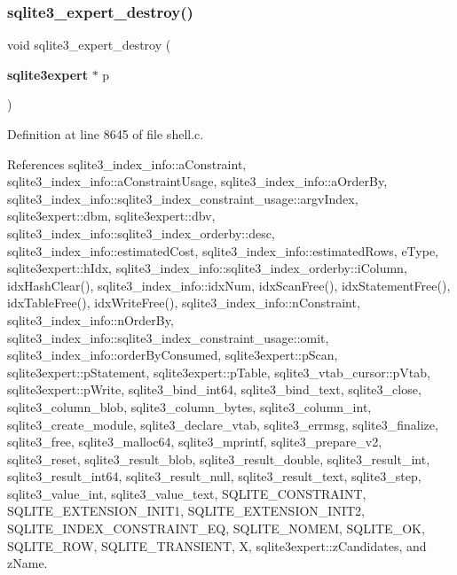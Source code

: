 \subsubsection{sqlite3\+\_\+expert\+\_\+destroy()}
{\footnotesize\ttfamily void sqlite3\+\_\+expert\+\_\+destroy (\begin{DoxyParamCaption}\item[{\textbf{ sqlite3expert} $\ast$}]{p }\end{DoxyParamCaption})}



Definition at line 8645 of file shell.\+c.



References sqlite3\+\_\+index\+\_\+info\+::a\+Constraint, sqlite3\+\_\+index\+\_\+info\+::a\+Constraint\+Usage, sqlite3\+\_\+index\+\_\+info\+::a\+Order\+By, sqlite3\+\_\+index\+\_\+info\+::sqlite3\+\_\+index\+\_\+constraint\+\_\+usage\+::argv\+Index, sqlite3expert\+::dbm, sqlite3expert\+::dbv, sqlite3\+\_\+index\+\_\+info\+::sqlite3\+\_\+index\+\_\+orderby\+::desc, sqlite3\+\_\+index\+\_\+info\+::estimated\+Cost, sqlite3\+\_\+index\+\_\+info\+::estimated\+Rows, e\+Type, sqlite3expert\+::h\+Idx, sqlite3\+\_\+index\+\_\+info\+::sqlite3\+\_\+index\+\_\+orderby\+::i\+Column, idx\+Hash\+Clear(), sqlite3\+\_\+index\+\_\+info\+::idx\+Num, idx\+Scan\+Free(), idx\+Statement\+Free(), idx\+Table\+Free(), idx\+Write\+Free(), sqlite3\+\_\+index\+\_\+info\+::n\+Constraint, sqlite3\+\_\+index\+\_\+info\+::n\+Order\+By, sqlite3\+\_\+index\+\_\+info\+::sqlite3\+\_\+index\+\_\+constraint\+\_\+usage\+::omit, sqlite3\+\_\+index\+\_\+info\+::order\+By\+Consumed, sqlite3expert\+::p\+Scan, sqlite3expert\+::p\+Statement, sqlite3expert\+::p\+Table, sqlite3\+\_\+vtab\+\_\+cursor\+::p\+Vtab, sqlite3expert\+::p\+Write, sqlite3\+\_\+bind\+\_\+int64, sqlite3\+\_\+bind\+\_\+text, sqlite3\+\_\+close, sqlite3\+\_\+column\+\_\+blob, sqlite3\+\_\+column\+\_\+bytes, sqlite3\+\_\+column\+\_\+int, sqlite3\+\_\+create\+\_\+module, sqlite3\+\_\+declare\+\_\+vtab, sqlite3\+\_\+errmsg, sqlite3\+\_\+finalize, sqlite3\+\_\+free, sqlite3\+\_\+malloc64, sqlite3\+\_\+mprintf, sqlite3\+\_\+prepare\+\_\+v2, sqlite3\+\_\+reset, sqlite3\+\_\+result\+\_\+blob, sqlite3\+\_\+result\+\_\+double, sqlite3\+\_\+result\+\_\+int, sqlite3\+\_\+result\+\_\+int64, sqlite3\+\_\+result\+\_\+null, sqlite3\+\_\+result\+\_\+text, sqlite3\+\_\+step, sqlite3\+\_\+value\+\_\+int, sqlite3\+\_\+value\+\_\+text, S\+Q\+L\+I\+T\+E\+\_\+\+C\+O\+N\+S\+T\+R\+A\+I\+NT, S\+Q\+L\+I\+T\+E\+\_\+\+E\+X\+T\+E\+N\+S\+I\+O\+N\+\_\+\+I\+N\+I\+T1, S\+Q\+L\+I\+T\+E\+\_\+\+E\+X\+T\+E\+N\+S\+I\+O\+N\+\_\+\+I\+N\+I\+T2, S\+Q\+L\+I\+T\+E\+\_\+\+I\+N\+D\+E\+X\+\_\+\+C\+O\+N\+S\+T\+R\+A\+I\+N\+T\+\_\+\+EQ, S\+Q\+L\+I\+T\+E\+\_\+\+N\+O\+M\+EM, S\+Q\+L\+I\+T\+E\+\_\+\+OK, S\+Q\+L\+I\+T\+E\+\_\+\+R\+OW, S\+Q\+L\+I\+T\+E\+\_\+\+T\+R\+A\+N\+S\+I\+E\+NT, X, sqlite3expert\+::z\+Candidates, and z\+Name.



